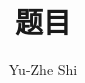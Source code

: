 \documentclass[fontset=fandol]{ctexart}
\title{题目}
\author{Yu-Zhe Shi}
\begin{document}
\newtheorem{proof}{\hspace{2em}Proof}
\newtheorem{lemma}{\hspace{2em}Lemma}
\newtheorem{definition}{\hspace{2em}Definition}
\newtheorem{proposition}{\hspace{2em}Proposition}
\maketitle
\end{document}
